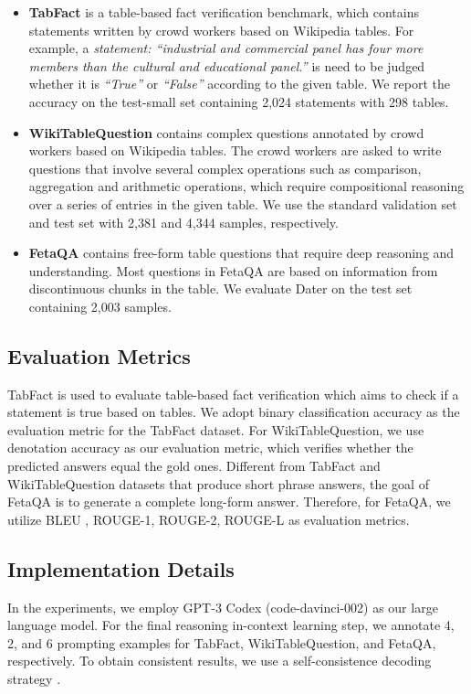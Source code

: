 \documentclass{article}
\begin{document}
\begin{itemize}
    \item \textbf{TabFact} is a table-based fact verification benchmark, which contains statements written by crowd workers based on Wikipedia tables. For example, a \textit{statement: ``industrial and commercial panel has four more members than the cultural and educational panel.''} is need to be judged whether it is \textit{``True''} or \textit{``False''} according to the given table.
    We report the accuracy on the test-small set containing 2,024 statements with 298 tables.
    \item \textbf{WikiTableQuestion} contains complex questions annotated by crowd workers based on Wikipedia tables. The crowd workers are asked to write questions that involve several complex operations such as comparison, aggregation and arithmetic operations, which require compositional reasoning over a series of entries in the given table. 
    We use the standard validation set and test set with 2,381 and 4,344 samples, respectively.
    \item \textbf{FetaQA} contains free-form table questions that require deep reasoning and understanding. Most questions in FetaQA are based on information from discontinuous chunks in the table. 
    We evaluate Dater on the test set containing 2,003 samples. 
\end{itemize}

\subsection{Evaluation Metrics}
TabFact is used to evaluate table-based fact verification which aims to check if a statement is true based on tables. We adopt binary classification accuracy as the evaluation metric for the TabFact dataset. For WikiTableQuestion, we use denotation accuracy as our evaluation metric, which verifies whether the predicted answers equal the gold ones. Different from TabFact and WikiTableQuestion datasets that produce short phrase answers, the goal of FetaQA is to generate a complete long-form answer. Therefore, for FetaQA, we utilize BLEU \citep{bleu}, ROUGE-1, ROUGE-2, ROUGE-L \citep{rouge} as evaluation metrics.

\subsection{Implementation Details}
In the experiments, we employ GPT-3 Codex (code-davinci-002) as our large language model.  
For the final reasoning in-context learning step, we annotate 4, 2, and 6 prompting examples for TabFact, WikiTableQuestion, and FetaQA, respectively. 
To obtain consistent results, we use a self-consistence decoding strategy \citep{cotsc}. 
\end{document}
